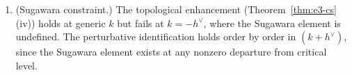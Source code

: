 \begin{theorem}
\begin{enumerate}[label=\textup{(\roman*)}]
  one-dimensional, so the deformation base is
  one-dimensional at each order in $\lambda$. The
  isomorphism~\eqref{eq:e3-families} is forced by
  the matching of associated graded algebras
  \textup{(}both $C^*(\fg)$\textup{)},
  matching $\Pthree$ brackets on the formal disk
  \textup{(}Theorem~\textup{\ref{thm:chiral-e3-cfg}(ii)}%
  \textup{)}, and the one-dimensionality of the
  obstruction space at each order.
\item \textup{(Sugawara constraint.)}
  The topological enhancement
  \textup{(}Theorem~\ref{thm:e3-cs}(iv)\textup{)} holds
  at generic $k$ but fails at $k = -h^\vee$, where
  the Sugawara element is undefined. The perturbative
  identification holds
  order by order in $(k + h^\vee)$, since the Sugawara
  element exists at any nonzero departure from critical
  level.
\end{enumerate}
\end{theorem}

